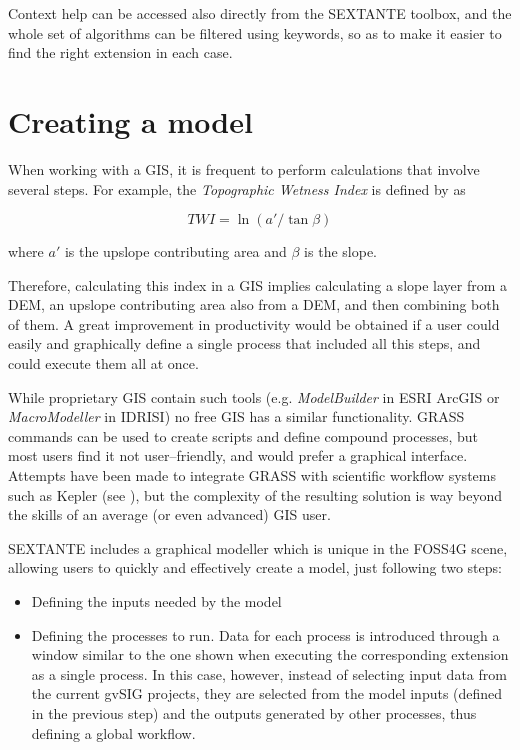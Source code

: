 \documentclass[12pt,a4paper,twocolumn]{article}
\begin{document}
Context help can be accessed also directly from the SEXTANTE toolbox, and the whole set of algorithms can be filtered using keywords, so as to make it easier to find the right extension in each case. 

\section{Creating a model}

When working with a GIS, it is frequent to perform calculations that involve several steps. For example, the \emph{Topographic Wetness Index} is defined by \cite{TOPMODEL} as

\begin{equation}
TWI=\ln (a'/\tan \beta)
\end{equation}

\noindent where $a'$ is the upslope contributing area and $\beta$ is the slope.

Therefore, calculating this index in a GIS implies calculating a slope layer from a DEM, an upslope contributing area also from a DEM, and then combining both of them. A great improvement in productivity would be obtained if a user could easily and graphically define a single process that included all this steps, and could execute them all at once.

While proprietary GIS contain such tools (e.g. \emph{ModelBuilder} in ESRI ArcGIS or \emph{MacroModeller} in IDRISI) no free GIS has a similar functionality. GRASS commands can be used to create scripts and define compound processes, but most users find it not user--friendly, and would prefer a graphical interface. Attempts have been made to integrate GRASS with scientific workflow systems such as Kepler (see \cite{GrassKepler}), but the complexity of the resulting solution is way beyond the skills of an average (or even advanced) GIS user.

SEXTANTE includes a graphical modeller which is unique in the FOSS4G scene, allowing users to quickly and effectively create a model, just following two steps:

\begin{itemize}
	\item Defining the inputs needed by the model
	\item Defining the processes to run. Data for each process is introduced through a window similar to the one shown when executing the corresponding extension as a single process. In this case, however, instead of selecting input data from the current gvSIG projects, they are selected from the model inputs (defined in the previous step) and the outputs generated by other processes, thus defining a global workflow.	
\end{itemize}
\end{document}
